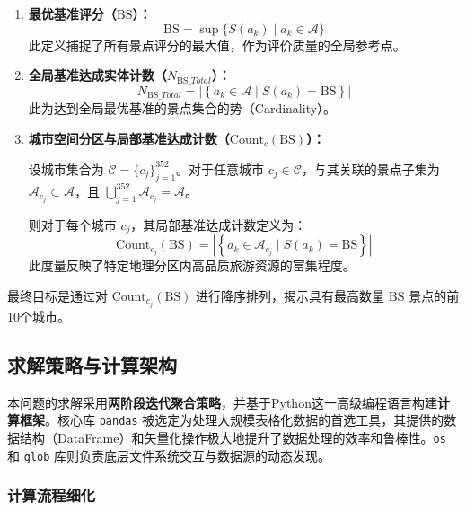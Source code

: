 \documentclass[12pt]{article}
\newcommand{\BS}{\text{BS}}
\newcommand{\NBS}{N_{\BS\_Total}}
\begin{document}
\begin{enumerate}[leftmargin=*]
    \item \textbf{最优基准评分（$\BS$）：}
    \begin{equation}
        \BS = \sup \{S(a_k) \mid a_k \in \mathcal{A}\}
    \end{equation}
    此定义捕捉了所有景点评分的最大值，作为评价质量的全局参考点。

    \item \textbf{全局基准达成实体计数（$\NBS$）：}
    \begin{equation}
        \NBS = |\left\{a_k \in \mathcal{A} \mid S(a_k) = \BS\right\}|
    \end{equation}
    此为达到全局最优基准的景点集合的势（Cardinality）。

    \item \textbf{城市空间分区与局部基准达成计数（$\text{Count}_{c}(\BS)$）：}
    
    设城市集合为 $\mathcal{C} = \{c_j\}_{j=1}^{352}$。对于任意城市 $c_j \in \mathcal{C}$，与其关联的景点子集为 $\mathcal{A}_{c_j} \subset \mathcal{A}$，且 $\bigcup_{j=1}^{352} \mathcal{A}_{c_j} = \mathcal{A}$。
    
    则对于每个城市 $c_j$，其局部基准达成计数定义为：
    \begin{equation}
        \text{Count}_{c_j}(\BS) = |\left\{a_k \in \mathcal{A}_{c_j} \mid S(a_k) = \BS\right\}|
    \end{equation}
    此度量反映了特定地理分区内高品质旅游资源的富集程度。
\end{enumerate}

最终目标是通过对 $\text{Count}_{c_j}(\BS)$ 进行降序排列，揭示具有最高数量 $\BS$ 景点的前10个城市。

\subsection{求解策略与计算架构}

本问题的求解采用\textbf{两阶段迭代聚合策略}，并基于Python这一高级编程语言构建\textbf{计算框架}。核心库 \texttt{pandas} 被选定为处理大规模表格化数据的首选工具，其提供的数据结构（DataFrame）和矢量化操作极大地提升了数据处理的效率和鲁棒性。\texttt{os} 和 \texttt{glob} 库则负责底层文件系统交互与数据源的动态发现。

\subsubsection{计算流程细化}
\end{document}
